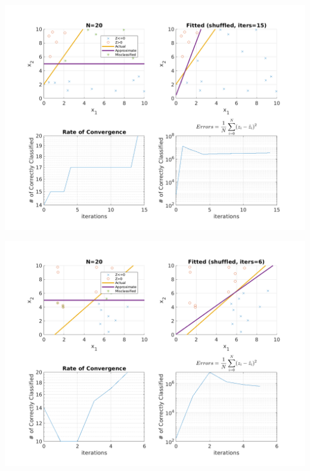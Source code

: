 \documentclass{article}
\newenvironment{Figure}
  {\par\medskip\noindent\minipage{\linewidth}}
  {\endminipage\par\medskip}
\begin{document}
\begin{multicols}{2}
\begin{Figure}
\end{Figure}
\begin{Figure}
\centering
\includegraphics[width=\linewidth]{pngs/n20_shuffled4.png}
\end{Figure}
\begin{Figure}
\centering
\includegraphics[width=\linewidth]{pngs/n20_shuffled5.png}
\end{Figure}


\end{multicols}
\end{document}
